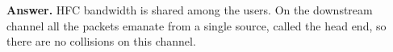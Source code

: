 
\textbf{Answer.} HFC bandwidth is shared among the users. On the
downstream channel all the packets emanate from a single source,
called the head end, so there are no collisions on this channel.
